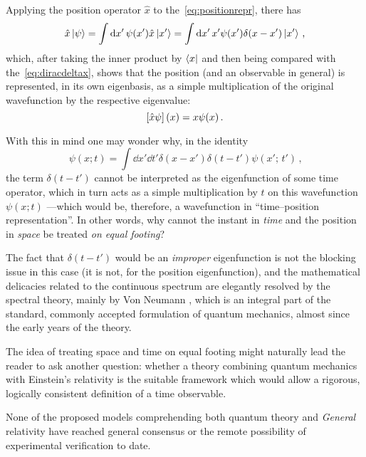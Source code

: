 Applying the position operator $\hat{x}$ to the~\eqref{eq:positionrepr}, there has
\begin{equation}
  \hat{x}\ket{\psi} = \int \dd{x'} \psi(x') \hat{x} \ket{x'} = \int \dd{x'} x' \psi(x') \delta(x-x') \ket{x'}
  \,\text{,}
\end{equation}
which,
after taking the inner product by $\bra{x}$ and then being compared with the~\eqref{eq:diracdeltax},
shows that the position
(and an observable in general) is represented, in its own eigenbasis,
as a simple multiplication of the original wavefunction by the respective eigenvalue:
\begin{equation}
  \qty[\hat{x}\psi](x) = x\psi(x) \,\text{.}
\end{equation}

With this in mind one may wonder why, in the identity
\begin{equation}\label{eq:diracdeltaxt}
  \psi(x; t) = \int \dd{x'}\dd{t'} \delta(x-x')\delta(t-t') \psi(x';\, t') \,\text{,}
\end{equation}
the term $\delta(t-t')$ cannot be interpreted as the eigenfunction of some time operator,
which in turn acts as a simple multiplication by $t$ on this
wavefunction $\psi(x; t)$ ---which would be, therefore, a wavefunction in ``time--position representation''.
In other words, why cannot the instant in \emph{time} and the position in \emph{space} be treated
\emph{on equal footing}?

The fact that $\delta(t-t')$ would be an \emph{improper} eigenfunction
is not the blocking issue in this case (it is not, for the position eigenfunction),
and the mathematical delicacies related to the continuous spectrum are
elegantly resolved by the spectral theory, mainly by Von Neumann
\parencite{VonNeumann}, which is an integral part of the standard, commonly accepted
formulation of quantum mechanics, almost since the early years of the theory.

The idea of treating space and time on equal footing might naturally lead the reader to
ask another question: whether a theory combining quantum mechanics with Einstein's
relativity is the suitable framework which would allow a rigorous, logically consistent
definition of a time observable.

None of the proposed models comprehending both quantum theory and \emph{General} relativity
have reached general consensus or the remote possibility of experimental verification to date.
